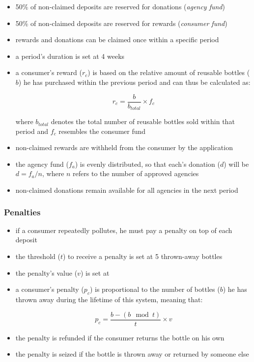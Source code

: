 \begin{itemize}
 	\item 50\% of non-claimed deposits are reserved for donations (\textit{agency fund})
  	\item 50\% of non-claimed deposits are reserved for rewards (\textit{consumer fund})
  	\item rewards and donations can be claimed once within a specific period
  	\item a period's duration is set at 4 weeks
  	\item a consumer's reward ($r_c$) is based on the relative amount of reusable bottles ($b$) he has purchased within the previous period and can thus be calculated as:

\begin{equation}
r_c = \frac{b}{b_{total}} \times f_c
\label{eq:rewardCalculation}
\end{equation}

where $b_{total}$ denotes the total number of reusable bottles sold within that period and $f_c$ resembles the consumer fund

	\item non-claimed rewards are withheld from the consumer by the application %
  	\item the agency fund ($f_a$) is evenly distributed, so that each's donation ($d$) will be $d = f_a/n$, where $n$ refers to the number of approved agencies
  	\item non-claimed donations remain available for all agencies in the next period
\end{itemize}

\subsubsection{Penalties}

\begin{itemize}
 	\item if a consumer repeatedly pollutes, he must pay a penalty on top of each deposit
	\item the threshold ($t$) to receive a penalty is set at 5 thrown-away bottles
  	\item the penalty's value ($v$) is set at 
  	\item a consumer's penalty ($p_c$) is proportional to the number of bottles ($b$) he has thrown away during the lifetime of this system, meaning that: 

\begin{equation}
p_c = \frac{b - (b \mod t)}{t} \times v
\label{eq:penaltyCalculcation}
\end{equation}

  	\item the penalty is refunded if the consumer returns the bottle on his own
  	\item the penalty is seized if the bottle is thrown away or returned by someone else
\end{itemize}


